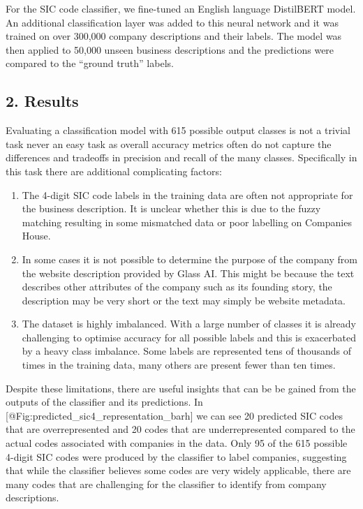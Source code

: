 \documentclass[
]{article}
\providecommand{\tightlist}{%
  \setlength{\itemsep}{0pt}\setlength{\parskip}{0pt}}
\begin{document}
For the SIC code classifier, we fine-tuned an English language
DistilBERT model. An additional classification layer was added to this
neural network and it was trained on over 300,000 company descriptions
and their labels. The model was then applied to 50,000 unseen business
descriptions and the predictions were compared to the ``ground truth''
labels.

\hypertarget{results}{%
\subsection{2. Results}\label{results}}

Evaluating a classification model with 615 possible output classes is
not a trivial task never an easy task as overall accuracy metrics often
do not capture the differences and tradeoffs in precision and recall of
the many classes. Specifically in this task there are additional
complicating factors:

\begin{enumerate}
\def\labelenumi{\arabic{enumi}.}
\tightlist
\item
  The 4-digit SIC code labels in the training data are often not
  appropriate for the business description. It is unclear whether this
  is due to the fuzzy matching resulting in some mismatched data or poor
  labelling on Companies House.
\item
  In some cases it is not possible to determine the purpose of the
  company from the website description provided by Glass AI. This might
  be because the text describes other attributes of the company such as
  its founding story, the description may be very short or the text may
  simply be website metadata.
\item
  The dataset is highly imbalanced. With a large number of classes it is
  already challenging to optimise accuracy for all possible labels and
  this is exacerbated by a heavy class imbalance. Some labels are
  represented tens of thousands of times in the training data, many
  others are present fewer than ten times.
\end{enumerate}

Despite these limitations, there are useful insights that can be be
gained from the outputs of the classifier and its predictions. In
{[}@Fig:predicted\_sic4\_representation\_barh{]} we can see 20 predicted
SIC codes that are overrepresented and 20 codes that are
underrepresented compared to the actual codes associated with companies
in the data. Only 95 of the 615 possible 4-digit SIC codes were produced
by the classifier to label companies, suggesting that while the
classifier believes some codes are very widely applicable, there are
many codes that are challenging for the classifier to identify from
company descriptions.
\end{document}
